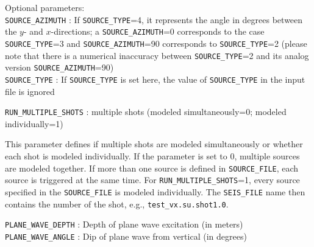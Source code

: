 Optional parameters:\\
\texttt{SOURCE\_AZIMUTH} : If \texttt{SOURCE\_TYPE}=4, it represents the angle in degrees between the $y$- and $x$-directions; a \texttt{SOURCE\_AZIMUTH}=0 corresponds to the case \texttt{SOURCE\_TYPE}=3 and \texttt{SOURCE\_AZIMUTH}=90 corresponds to \texttt{SOURCE\_TYPE}=2 (please note that there is a numerical inaccuracy between \texttt{SOURCE\_TYPE}=2 and its analog version \texttt{SOURCE\_AZIMUTH}=90)\\
\texttt{SOURCE\_TYPE} : If \texttt{SOURCE\_TYPE} is set here, the value of \texttt{SOURCE\_TYPE} in the input file is ignored

\texttt{RUN\_MULTIPLE\_SHOTS} : multiple shots (modeled simultaneously=0; modeled individually=1)

This parameter defines if multiple shots are modeled simultaneously or whether each shot is modeled individually. If the parameter is set to 0, multiple sources are modeled together. If more than one source is defined in \texttt{SOURCE\_FILE}, each source is triggered at the same time. For \texttt{RUN\_MULTIPLE\_SHOTS}=1, every source specified in the \texttt{SOURCE\_FILE} is modeled individually. The \texttt{SEIS\_FILE} name then contains the number of the shot, e.g., \texttt{test\_vx.su.shot1.0}.

\texttt{PLANE\_WAVE\_DEPTH} : Depth of plane wave excitation (in meters)\\
\texttt{PLANE\_WAVE\_ANGLE} : Dip of plane wave from vertical (in degrees)

